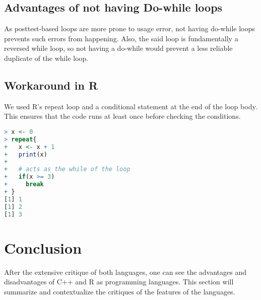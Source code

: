 \documentclass[12pt]{article}
\begin{document}
\subsection{Advantages of not having Do-while loops}
As posttest-based loops are more prone to usage error, not having do-while loops prevents such errors from happening. Also, the said loop is fundamentally a reversed while loop, so not having a do-while would prevent a less reliable duplicate of the while loop.

\subsection{Workaround in R}
We used R's repeat loop and a conditional statement at the end of the loop body. This ensures that the code runs at least once before checking the conditions.

\begin{lstlisting}[language=R ]
> x <- 0
> repeat{
+   x <- x + 1
+   print(x)
+
+   # acts as the while of the loop
+   if(x >= 3)
+     break
+ }
[1] 1
[1] 2
[1] 3
\end{lstlisting}

\section{Conclusion}
After the extensive critique of both languages, one can see the advantages and disadvantages of C++ and R as programming languages. This section will summarize and contextualize the critiques of the features of the languages.
\end{document}
